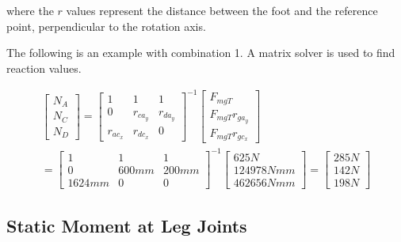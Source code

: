 where the $r$ values represent the distance between the foot and the reference point, perpendicular to the rotation axis.

The following is an example with combination 1. A matrix solver is used to find reaction values.

\begin{equation}
\begin{split}
    \left[ \begin{array}{ccc} 
    N_A 
    \\ 
   N_C
    \\ 
    N_D
    \end{array} \right]= \left[ \begin{array}{ccc} 
    1 & 1 & 1 
    \\ 
    0 & r_{ca_y} & r_{da_y} 
    \\ 
    r_{ac_x} & r_{dc_x} & 0
    \end{array} \right]^{-1}
    \left[ \begin{array}{ccc} 
    F_{mgT}
    \\ 
    F_{mgT} r_{ga_y} 
    \\ 
    F_{mgT} r_{gc_x}
    \end{array} \right] 
    \\ 
   = \left[ \begin{array}{ccc} 
    1 & 1 & 1 
    \\ 
    0 & 600 mm & 200mm 
    \\ 
    1624mm & 0 & 0
    \end{array} \right]^{-1}
    \left[ \begin{array}{ccc} 
    625N
    \\ 
    124978Nmm
    \\ 
    462656Nmm
    \end{array} \right] 
    = 
    \left[ \begin{array}{ccc} 
    285N
    \\ 
    142N
    \\ 
    198N
    \end{array} \right] 
\end{split}
\end{equation}



\subsection{Static Moment at Leg Joints}

